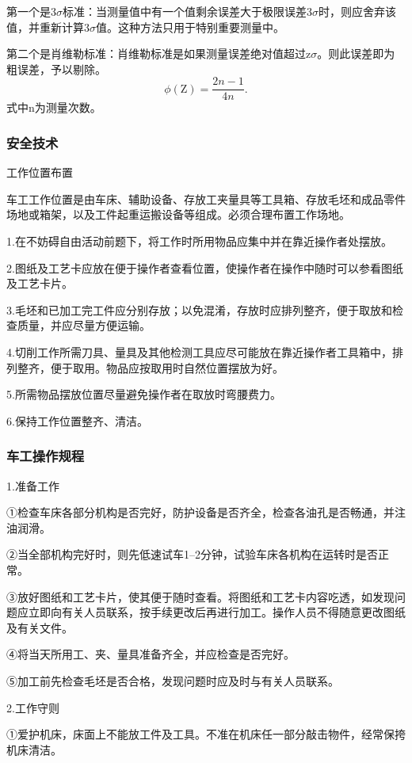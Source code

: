 \documentclass{ctexbook}
\begin{document}
第一个是3$\sigma$标准：当测量值中有一个值剩余误差大于极限误差3$\sigma$时，则应舍弃该值，并重新计算3$\sigma$值。这种方法只用于特别重要测量中。

第二个是肖维勒标准：肖维勒标准是如果测量误差绝对值超过z$\sigma$。则此误差即为粗误差，予以剔除。
\begin{equation*}
	\phi (\text{Z})=\frac{2n-1}{4n}.
\end{equation*}
式中n为测量次数。

\subsubsection{安全技术}
工作位置布置

车工工作位置是由车床、辅助设备、存放工夹量具等工具箱、存放毛坯和成品零件场地或箱架，以及工件起重运搬设备等组成。必须合理布置工作场地。

1.在不妨碍自由活动前题下，将工作时所用物品应集中并在靠近操作者处摆放。

2.图纸及工艺卡应放在便于操作者查看位置，使操作者在操作中随时可以参看图纸及工艺卡片。

3.毛坯和已加工完工件应分别存放；以免混淆，存放时应排列整齐，便于取放和检查质量，并应尽量方便运输。

4.切削工作所需刀具、量具及其他检测工具应尽可能放在靠近操作者工具箱中，排列整齐，便于取用。物品应按取用时自然位置摆放为好。

5.所需物品摆放位置尽量避免操作者在取放时弯腰费力。

6.保持工作位置整齐、清洁。

\subsubsection{车工操作规程}
1.准备工作

①检查车床各部分机构是否完好，防护设备是否齐全，检查各油孔是否畅通，并注油润滑。

②当全部机构完好时，则先低速试车1--2分钟，试验车床各机构在运转时是否正常。

③放好图纸和工艺卡片，使其便于随时查看。将图纸和工艺卡内容吃透，如发现问题应立即向有关人员联系，按手续更改后再进行加工。操作人员不得随意更改图纸及有关文件。

④将当天所用工、夹、量具准备齐全，并应检查是否完好。

⑤加工前先检查毛坯是否合格，发现问题时应及时与有关人员联系。

2.工作守则

①爱护机床，床面上不能放工件及工具。不准在机床任一部分敲击物件，经常保挎机床清洁。
\end{document}
